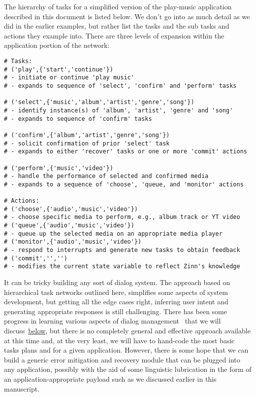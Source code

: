 \documentclass[letterpaper,11pt]{article}
\begin{document}
The hierarchy of tasks for a simplified version of the play-music application described in this document is listed below.  We don't go into as much detail as we did in the earlier examples, but rather list the tasks and the sub tasks and actions they example into.  There are three levels of expansion within the application portion of the network: 
%
\begin{verbatim}
# Tasks:
# ('play',{'start','continue'})
# - initiate or continue 'play music'
# - expands to sequence of 'select', 'confirm' and 'perform' tasks

# ('select',{'music','album','artist','genre','song'})
# - identify instance(s) of 'album', 'artist', 'genre' and 'song'
# - expands to sequence of 'confirm' tasks

# ('confirm',{'album','artist','genre','song'})
# - solicit confirmation of prior 'select' task
# - expands to either 'recover' tasks or one or more 'commit' actions

# ('perform',{'music','video'})
# - handle the performance of selected and confirmed media
# - expands to a sequence of 'choose', 'queue, and 'monitor' actions

# Actions:
# ('choose',{'audio','music','video'})
# - choose specific media to perform, e.g., album track or YT video
# ('queue',{'audio','music','video'})
# - queue up the selected media on an appropriate media player
# ('monitor',{'audio','music','video'})
# - respond to interrupts and generate new tasks to obtain feedback
# ('commit','','')
# - modifies the current state variable to reflect Zinn's knowledge
\end{verbatim}
%
It can be tricky building any sort of dialog system. The approach based on hierarchical task networks outlined here, simplifies some aspects of system development, but getting all the edge cases right, inferring user intent and generating appropriate responses is still challenging.  There has been some progress in learning various aspects of dialog management~\cite{SinghetalNIPS-99,ChotimongkolandRudnickyEMNLP-08} that we will discuss~\href{#interacting_for_training_examples}{below}, but there is no completely general and effective approach available at this time and, at the very least, we will have to hand-code the most basic tasks plans and for a given application. However, there is some hope that we can build a generic error mitigation and recovery module that can be plugged into any application, possibly with the aid of some linguistic lubrication in the form of an application-appropriate payload such as we discussed earlier in this manuscript.
\end{document}
